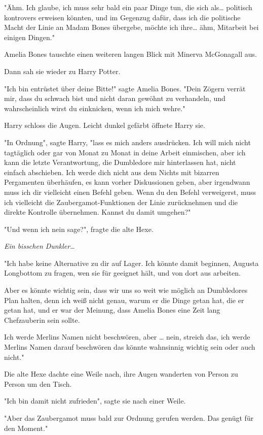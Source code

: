 {"Ähm. Ich glaube, ich muss sehr bald ein paar Dinge tun, die sich als… politisch kontrovers erweisen könnten, und im Gegenzug dafür, dass ich die politische Macht der Linie an Madam Bones übergebe, möchte ich ihre… ähm, Mitarbeit bei einigen Dingen."

Amelia Bones tauschte einen weiteren langen Blick mit Minerva McGonagall aus.

Dann sah sie wieder zu Harry Potter.

"Ich bin entrüstet über deine Bitte!" sagte Amelia Bones. "Dein Zögern verrät mir, dass du schwach bist und nicht daran gewöhnt zu verhandeln, und wahrscheinlich wirst du einknicken, wenn ich mich wehre."

Harry schloss die Augen. Leicht dunkel gefärbt öffnete Harry sie.

"In Ordnung", sagte Harry, "lass es mich anders ausdrücken. Ich will mich nicht tagtäglich oder gar von Monat zu Monat in deine Arbeit einmischen, aber ich kann die letzte Verantwortung, die Dumbledore mir hinterlassen hat, nicht einfach abschieben. Ich werde dich nicht aus dem Nichts mit bizarren Pergamenten überhäufen, es kann vorher Diskussionen geben, aber irgendwann muss ich dir vielleicht einen Befehl geben. Wenn du den Befehl verweigerst, muss ich vielleicht die Zaubergamot-Funktionen der Linie zurücknehmen und die direkte Kontrolle übernehmen. Kannst du damit umgehen?"

"Und wenn ich nein sage?", fragte die alte Hexe.

\emph{Ein bisschen Dunkler…}

"Ich habe keine Alternative zu dir auf Lager. Ich könnte damit beginnen, Augusta Longbottom zu fragen, wen sie für geeignet hält, und von dort aus arbeiten.

Aber es könnte wichtig sein, dass wir uns so weit wie möglich an Dumbledores Plan halten, denn ich weiß nicht genau, warum er die Dinge getan hat, die er getan hat, und er war der Meinung, dass Amelia Bones eine Zeit lang Chefzauberin sein sollte.

Ich werde Merlins Namen nicht beschwören, aber … nein, streich das, ich werde Merlins Namen darauf beschwören das könnte wahnsinnig wichtig sein oder auch nicht."

Die alte Hexe dachte eine Weile nach, ihre Augen wanderten von Person zu Person um den Tisch.

"Ich bin damit nicht zufrieden", sagte sie nach einer Weile.

"Aber das Zaubergamot muss bald zur Ordnung gerufen werden. Das genügt für den Moment."

}
